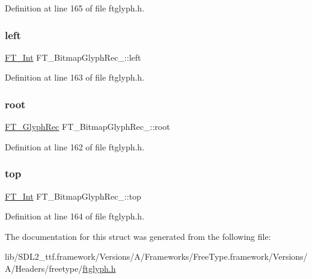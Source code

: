 Definition at line 165 of file ftglyph.\+h.

\mbox{\label{struct_f_t___bitmap_glyph_rec___a6cfd2d89af7b6be4af886047c9cb7e0a}} 
\subsubsection{\texorpdfstring{left}{left}}
{\footnotesize\ttfamily \mbox{\hyperlink{fttypes_8h_af90e5fb0d07e21be9fe6faa33f02484c}{F\+T\+\_\+\+Int}} F\+T\+\_\+\+Bitmap\+Glyph\+Rec\+\_\+\+::left}



Definition at line 163 of file ftglyph.\+h.

\mbox{\label{struct_f_t___bitmap_glyph_rec___ac3970353fbc0fe3d4c59c3fd608140f3}} 
\subsubsection{\texorpdfstring{root}{root}}
{\footnotesize\ttfamily \mbox{\hyperlink{ftglyph_8h_a095b515f46c978b33ffc9c20aad081a4}{F\+T\+\_\+\+Glyph\+Rec}} F\+T\+\_\+\+Bitmap\+Glyph\+Rec\+\_\+\+::root}



Definition at line 162 of file ftglyph.\+h.

\mbox{\label{struct_f_t___bitmap_glyph_rec___a25fc81296678d6a2d064843c01bc05f7}} 
\subsubsection{\texorpdfstring{top}{top}}
{\footnotesize\ttfamily \mbox{\hyperlink{fttypes_8h_af90e5fb0d07e21be9fe6faa33f02484c}{F\+T\+\_\+\+Int}} F\+T\+\_\+\+Bitmap\+Glyph\+Rec\+\_\+\+::top}



Definition at line 164 of file ftglyph.\+h.



The documentation for this struct was generated from the following file\+:\begin{DoxyCompactItemize}
\item 
lib/\+S\+D\+L2\+\_\+ttf.\+framework/\+Versions/\+A/\+Frameworks/\+Free\+Type.\+framework/\+Versions/\+A/\+Headers/freetype/\mbox{\hyperlink{ftglyph_8h}{ftglyph.\+h}}\end{DoxyCompactItemize}
